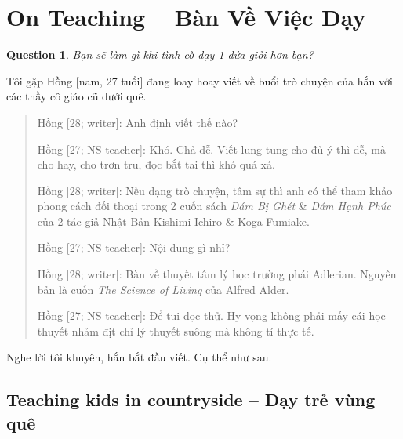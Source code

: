\documentclass[12pt]{article}
\newtheorem{question}{Question}
\begin{document}

\section{On Teaching -- Bàn Về Việc Dạy}
\label{sect: teaching}

\begin{question}
	Bạn sẽ làm gì khi tình cờ dạy 1 đứa giỏi hơn bạn?
\end{question}
Tôi gặp Hồng [nam, 27 tuổi] đang loay hoay viết về buổi trò chuyện của hắn với các thầy cô giáo cũ dưới quê.

\begin{quotation}
	{\sf Hồng [28; writer]}: Anh định viết thế nào?
	
	{\sf Hồng [27; NS teacher]}: Khó. Chả dễ. Viết lung tung cho đủ ý thì dễ, mà cho hay, cho trơn tru, đọc bắt tai thì khó quá xá.
	
	{\sf Hồng [28; writer]}: Nếu dạng trò chuyện, tâm sự thì anh có thể tham khảo phong cách đối thoại trong 2 cuốn sách {\it Dám Bị Ghét} \cite{Ichiro_Fumitake_disliked_VN} \& {\it Dám Hạnh Phúc} \cite{Ichiro_Fumitake_happy_VN} của 2 tác giả Nhật Bản {\sc Kishimi Ichiro \& Koga Fumiake}.
	
	{\sf Hồng [27; NS teacher]}: Nội dung gì nhỉ?
	
	{\sf Hồng [28; writer]}: Bàn về thuyết tâm lý học trường phái Adlerian. Nguyên bản là cuốn {\it The Science of Living} \cite{Adler2013} của {\sc Alfred Alder}.
	
	{\sf Hồng [27; NS teacher]}: Để tui đọc thử. Hy vọng không phải mấy cái học thuyết nhảm địt chỉ lý thuyết suông mà không tí thực tế.
\end{quotation}

Nghe lời tôi khuyên, hắn bắt đầu viết. Cụ thể như sau.

\subsection{Teaching kids in countryside -- Dạy trẻ vùng quê}
\end{document}

